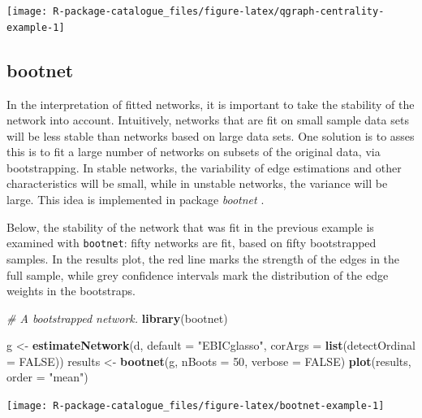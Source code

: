 \documentclass[]{book}
\newenvironment{Shaded}{\begin{snugshade}}{\end{snugshade}}
\newcommand{\KeywordTok}[1]{\textcolor[rgb]{0.13,0.29,0.53}{\textbf{#1}}}
\newcommand{\DataTypeTok}[1]{\textcolor[rgb]{0.13,0.29,0.53}{#1}}
\newcommand{\DecValTok}[1]{\textcolor[rgb]{0.00,0.00,0.81}{#1}}
\newcommand{\StringTok}[1]{\textcolor[rgb]{0.31,0.60,0.02}{#1}}
\newcommand{\CommentTok}[1]{\textcolor[rgb]{0.56,0.35,0.01}{\textit{#1}}}
\newcommand{\OtherTok}[1]{\textcolor[rgb]{0.56,0.35,0.01}{#1}}
\newcommand{\NormalTok}[1]{#1}
\begin{document}
\begin{center}\texttt{[image: R-package-catalogue\_files/figure-latex/qgraph-centrality-example-1]} \end{center}

\subsection{bootnet}\label{bootnet}


In the interpretation of fitted networks, it is important to take the
stability of the network into account. Intuitively, networks that are
fit on small sample data sets will be less stable than networks based on
large data sets. One solution is to asses this is to fit a large number
of networks on subsets of the original data, via bootstrapping. In
stable networks, the variability of edge estimations and other
characteristics will be small, while in unstable networks, the variance
will be large. This idea is implemented in package \emph{bootnet}
\citep{Epskamp2018a}.

Below, the stability of the network that was fit in the previous example
is examined with \texttt{bootnet}: fifty networks are fit, based on
fifty bootstrapped samples. In the results plot, the red line marks the
strength of the edges in the full sample, while grey confidence
intervals mark the distribution of the edge weights in the bootstraps.

\begin{Shaded}
\begin{Highlighting}[]
\CommentTok{# A bootstrapped network. }
\KeywordTok{library}\NormalTok{(bootnet)}

\NormalTok{g <-}\StringTok{ }\KeywordTok{estimateNetwork}\NormalTok{(d, }\DataTypeTok{default =} \StringTok{"EBICglasso"}\NormalTok{,}
                     \DataTypeTok{corArgs =} \KeywordTok{list}\NormalTok{(}\DataTypeTok{detectOrdinal =} \OtherTok{FALSE}\NormalTok{))}
\NormalTok{results <-}\StringTok{ }\KeywordTok{bootnet}\NormalTok{(g, }\DataTypeTok{nBoots =} \DecValTok{50}\NormalTok{, }\DataTypeTok{verbose =} \OtherTok{FALSE}\NormalTok{)}
\KeywordTok{plot}\NormalTok{(results, }\DataTypeTok{order =} \StringTok{"mean"}\NormalTok{)}
\end{Highlighting}
\end{Shaded}

\begin{center}\texttt{[image: R-package-catalogue\_files/figure-latex/bootnet-example-1]} \end{center}
\end{document}
